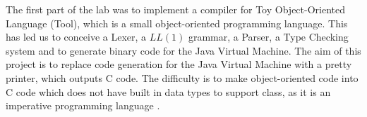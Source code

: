 The first part of the lab was to implement a compiler for Toy Object-Oriented Language (Tool),
which is a small object-oriented programming language.
\newline
This has led us to conceive a Lexer, a \(LL(1)\) grammar, a Parser, a Type Checking system and
to generate binary code for the Java Virtual Machine.
\newline
The aim of this project is to replace code generation for the Java Virtual Machine
with a pretty printer, which outputs C code.
\newline
The difficulty is to make object-oriented code into C code which does not have built in data types to support class, 
as it is an imperative programming language .
